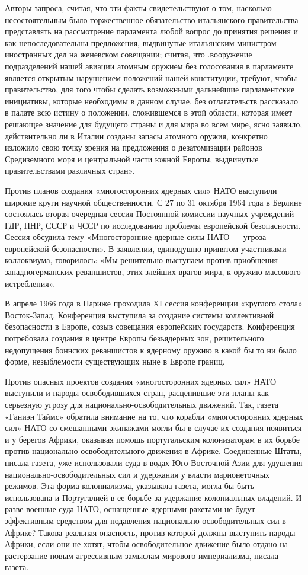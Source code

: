 \documentclass[12pt, a4paper, openany]{book}
\begin{document}
	Авторы запроса, считая, что эти факты свидетельствуют о том, насколько несостоятельным было торжественное обязательство итальянского правительства представлять на рассмотрение парламента любой вопрос до принятия решения и как непоследовательны предложения, выдвинутые итальянским министром иностранных дел на женевском совещании; считая, что .вооружение подразделений нашей авиации атомным оружием без голосования в парламенте является открытым нарушением положений нашей конституции, требуют, чтобы правительство, для того чтобы сделать возможными дальнейшие парламентские инициативы, которые необходимы в данном случае, без отлагательств рассказало в палате всю истину о положении, сложившемся в этой области, которая имеет решающее значение для будущего страны и для мира во всем мире, ясно заявило, действительно ли в Италии созданы запасы атомного оружия, конкретно изложило свою точку зрения на предложения о дезатомизации районов Средиземного моря и центральной части южной Европы, выдвинутые правительствами различных стран».
	
	Против планов создания «многосторонних ядерных сил» НАТО выступили широкие круги научной общественности. С 27 по 31 октября 1964 года в Берлине состоялась вторая очередная сессия Постоянной комиссии научных учреждений ГДР, ПНР, СССР и ЧССР по исследованию проблемы европейской безопасности. Сессия обсудила тему «Многосторонние ядерные силы НАТО — угроза европейской безопасности». В заявлении, единодушно принятом участниками коллоквиума, говорилось: «Мы решительно выступаем против приобщения западногерманских реваншистов, этих злейших врагов мира, к оружию массового истребления».
	
	В апреле 1966 года в Париже проходила XI сессия конференции «круглого стола» Восток-Запад. Конференция выступила за создание системы коллективной безопасности в Европе, созыв совещания европейских государств. Конференция потребовала создания в центре Европы безъядерных зон, решительного недопущения боннских реваншистов к ядерному оружию в какой бы то ни было форме, незыблемости существующих ныне в Европе границ.
	
	Против опасных проектов создания «многосторонних ядерных сил» НАТО выступили и народы освободившихся стран, расценившие эти планы как серьезную угрозу для национально-освободительных движений. Так, газета «Ганиэн Таймс» обратила внимание на то, что корабли «многосторонних ядерных сил» НАТО со смешанными экипажами могли бы в случае их создания появиться и у берегов Африки, оказывая помощь португальским колонизаторам в их борьбе против национально-освободительного движения в Африке. Соединенные Штаты, писала газета, уже использовали суда в водах Юго-Восточной Азии для удушения национально-освободительных сил и удержания у власти марионеточных режимов. Эта форма колониализма, указывала газета, могла бы быть использована и Португалией в ее борьбе за удержание колониальных владений. И разве военные суда НАТО, оснащенные ядерными ракетами не будут эффективным средством для подавления национально-освободительных сил в Африке? Такова реальная опасность, против которой должны выступить народы Африки, если они не хотят, чтобы освободительное движение было отдано на растерзание новым агрессивным замыслам мирового империализма, писала газета.
	
\end{document}
